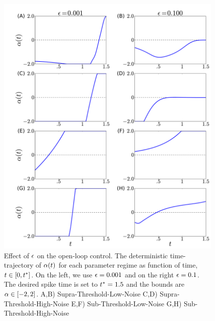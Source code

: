 \documentclass[12pt]{iopart}
\begin{document}
\begin{figure}[htp]
\begin{center}
  \includegraphics[width=\textwidth]{Figs/FP_Adjoint/Regimes_eps_comparison.pdf}
  \caption[labelInTOC]{Effect of ${\epsilon}$ on the open-loop control.
  The deterministic time-trajectory of ${\alpha}(t)$ for each
  parameter regime as function of time, $t \in [0, { t^* }]$.
  On the left, we use ${\epsilon} = 0.001$ and on the right ${\epsilon} =0.1$.
  The desired spike time is set to ${ t^* }=1.5$ and the bounds are ${\alpha} \in [-2,2]$.
    A,B)
   Supra-Threshold-Low-Noise
  C,D) 
   Supra-Threshold-High-Noise
  E,F)
   Sub-Threshold-Low-Noise
  G,H)
   Sub-Threshold-High-Noise}
  \label{fig:FBK_Regimes_cs_different_es} 
\end{center}
\end{figure}
\end{document}
